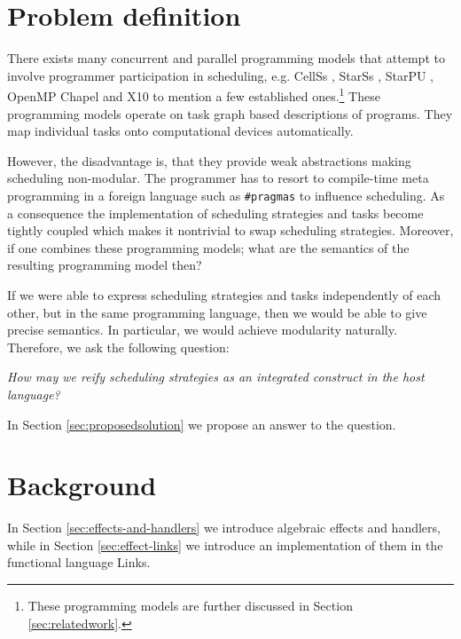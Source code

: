 \documentclass[preprint,10pt,numbers]{sigplanconf}
\begin{document}
  \section{Problem definition}\label{sec:problemdefinition}
There exists many concurrent and parallel programming models that attempt to involve programmer participation in scheduling, e.g. CellSs \cite{Bellens2009}, StarSs \cite{Planas2009}, StarPU \cite{Augonnet2011}, OpenMP \cite{Openmp2013} Chapel \cite{Chapel2012} and X10 \cite{X102015} to mention a few established ones.\footnote{These programming models are further discussed in Section \ref{sec:relatedwork}.}
These programming models operate on task graph based descriptions of programs. They map individual tasks onto computational devices automatically.

However, the disadvantage is, that they provide weak abstractions making scheduling non-modular. The programmer has to resort to compile-time meta programming in a foreign language such as \texttt{\#pragmas} to influence scheduling. As a consequence the implementation of scheduling strategies and tasks become tightly coupled which makes it nontrivial to swap scheduling strategies. Moreover, if one combines these programming models; what are the semantics of the resulting programming model then?

If we were able to express scheduling strategies and tasks independently of each other, but in the same programming language, then we would be able to give precise semantics. In particular, we would achieve modularity naturally. Therefore, we ask the following question:
\begin{center}
  \emph{How may we reify scheduling strategies as an integrated construct in the host language?}
\end{center}
In Section \ref{sec:proposedsolution} we propose an answer to the question.

\section{Background}\label{sec:background}
In Section \ref{sec:effects-and-handlers} we introduce algebraic effects and handlers, while in Section \ref{sec:effect-links} we introduce an implementation of them in the functional language Links.
\end{document}
